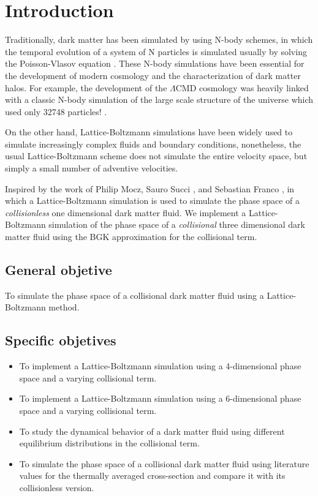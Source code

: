 \setcounter{page}{1}%
\belowdisplayshortskip=0pt
\renewcommand{\thepage}{\arabic{page}}%
\chapter{Introduction}

Traditionally, dark matter has been simulated by using N-body schemes, in which the temporal evolution of a system of N particles is simulated usually by solving the Poisson-Vlasov equation \cite{2012PDU150K}.
These N-body simulations have been essential for the development of modern cosmology and the characterization of dark matter halos.
For example, the development of the $\Lambda$CMD cosmology was heavily linked with a classic N-body simulation of the large scale structure of the universe which used only 32748 particles! \cite{1985ApJ292371D}.

On the other hand, Lattice-Boltzmann simulations have been widely used to simulate increasingly complex fluids and boundary conditions, nonetheless, the usual Lattice-Boltzmann scheme does not simulate the entire velocity space, but simply a small number of adventive velocities. 

Inspired by the work of Philip Mocz, Sauro Succi \cite{integerLatticeDynamics}, and Sebastian Franco \cite{franco}, in which a Lattice-Boltzmann simulation is used to simulate the phase space of a \emph{collisionless} one dimensional dark matter fluid. We implement a Lattice-Boltzmann simulation of the phase space of a \emph{collisional} three dimensional dark matter fluid using the BGK approximation for the collisional term.

\section{General objetive}
To simulate the phase space of a collisional dark matter fluid using a Lattice-Boltzmann method.
\section{Specific objetives}
\begin{itemize}
\item To implement a Lattice-Boltzmann simulation using a 4-dimensional phase space and a varying collisional term.
\item To implement a Lattice-Boltzmann simulation using a 6-dimensional phase space and a varying collisional term.
\item To study the dynamical behavior of a dark matter fluid using different equilibrium distributions in the collisional term.
\item To simulate the phase space of a collisional dark matter fluid using literature values for the thermally averaged cross-section and compare it with its collisionless version.
\end{itemize}


